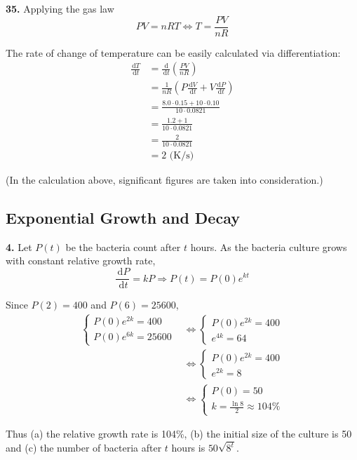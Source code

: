 \documentclass[a4paper,12pt]{article}
\newcommand{\ud}{\,\mathrm{d}}
\begin{document}
\noindent\textbf{35. }Applying the gas law
\[PV = nRT \iff T = \frac{PV}{nR}\]

The rate of change of temperature can be easily calculated via differentiation:
\begin{align*}
   \frac{\ud T}{\ud t}
&= \frac{\ud}{\ud t}\left(\frac{PV}{nR}\right)\\
&= \frac{1}{nR}\left(P\frac{\ud V}{\ud t} + V\frac{\ud P}{\ud t}\right)\\
&= \frac{8.0 \cdot 0.15 + 10 \cdot 0.10}{10 \cdot 0.0821}\\
&= \frac{1.2 + 1}{10 \cdot 0.0821}\\
&= \frac{2}{10 \cdot 0.0821}\\
&= 2\text{ (K/s)}
\end{align*}

(In the calculation above, significant figures are taken into consideration.)

\pagebreak\subsection{Exponential Growth and Decay}
\textbf{4. }Let $P(t)$ be the bacteria count after $t$ hours. As the bacteria
culture grows with constant relative growth rate,
\[\frac{\ud P}{\ud t} = kP \Longrightarrow P(t) = P(0)e^{kt}\]

Since $P(2) = 400$ and $P(6) = 25600$,
\begin{align*}
  \begin{cases}
    P(0)e^{2k} = 400\\
    P(0)e^{6k} = 25600
  \end{cases}
  &\iff
  \begin{cases}
    P(0)e^{2k} = 400\\
    e^{4k} = 64
  \end{cases}\\
  &\iff
  \begin{cases}
    P(0)e^{2k} = 400\\
    e^{2k} = 8
  \end{cases}\\
  &\iff
  \begin{cases}
    P(0) = 50\\
    k = \frac{\ln 8}{2} \approx 104\%
  \end{cases}
\end{align*}

Thus (a) the relative growth rate is 104\%, (b) the initial size of the culture
is 50 and (c) the number of bacteria after $t$ hours is $50\sqrt{8^t}$.
\end{document}
